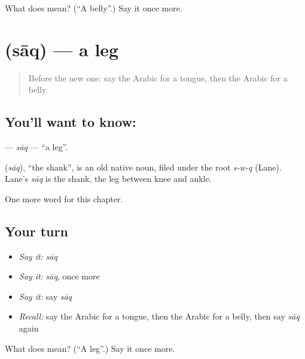 \begin{tcolorbox}[breakable,colback=teal!4,colframe=teal!35!black,title={Before you move on}]
What does  mean? (\textquotedblleft{}A belly\textquotedblright{}.) Say it once more.
\end{tcolorbox}
\section[\texorpdfstring{\ar{ساق} (sāq)}{ساق (sāq)}]{ (sāq) — a leg}

\label{lesson:AR-C141-saq}



\begin{quote}
Before the new one: say the Arabic for a tongue, then the Arabic for a belly.
\end{quote}

\subsection*{You'll want to know: }
\textbf{} — \emph{sāq} — \textquotedblleft{}a leg\textquotedblright{}.

\begin{cousinweb}
\textbf{} (\emph{sāq}), \textquotedblleft{}the shank\textquotedblright{}, is an old native noun, filed under the root \emph{s-w-q} (Lane). Lane's \emph{sāq} is the shank, the leg between knee and ankle.
\end{cousinweb}

\begin{grammarlens}[title={What you've built}]
One more word for this chapter.
\end{grammarlens}

\subsection*{Your turn}
\begin{itemize}
\raggedright
  \item \emph{Say it:} \emph{sāq}
  \item \emph{Say it:} \emph{sāq}, once more
  \item \emph{Say it:} say \emph{sāq}
  \item \emph{Recall:} say the Arabic for a tongue, then the Arabic for a belly, then say \emph{sāq} again
\end{itemize}

\begin{tcolorbox}[breakable,colback=teal!4,colframe=teal!35!black,title={Before you move on}]
What does  mean? (\textquotedblleft{}A leg\textquotedblright{}.) Say it once more.
\end{tcolorbox}
